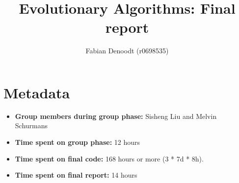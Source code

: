 \documentclass[a4paper,10pt]{article}
\title{Evolutionary Algorithms: Final report}
\author{Fabian Denoodt (r0698535)}
\def\retake{0}
\newcommand{\switch}[2]{\ifnum\retake=0{#1}\else{#2}\fi}
\newcommand{\thisyear}{\the\year}
\newcommand{\deadlineCode}{\switch{December 31, \thisyear{} at 18:00 CET}{August 14, \thisyear{} at 18:00 CET}}
\newcommand{\deadlineReport}{\deadlineCode}
\newcommand{\RemoveMe}[1]{{\color{purple}#1}}
\begin{document}
\selectfont{}

\maketitle

%
%
%
%
%
%

\section{Metadata}

\begin{itemize}
 \item \textbf{Group members during group phase:} Sisheng Liu and Melvin Schurmans
 \item \textbf{Time spent on group phase:} 12 hours
 \item \textbf{Time spent on final code:} 168 hours or more (3 * 7d * 8h).
 \item \textbf{Time spent on final report:} 14 hours
\end{itemize}
\end{document}

